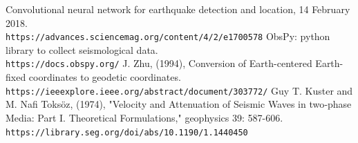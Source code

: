 \documentclass[10pt,conference,compsocconf]{IEEEtran}
\begin{document}
\begin{thebibliography}{9}
Convolutional neural network for earthquake detection and location, 14 February 2018. \\\texttt{https://advances.sciencemag.org/content/4/2/e1700578}
ObsPy: python library to collect seismological data.
\\\texttt{https://docs.obspy.org/}
J. Zhu, (1994),  Conversion of Earth-centered Earth-fixed coordinates to geodetic coordinates. \\\texttt{https://ieeexplore.ieee.org/abstract/document/303772/}
Guy T. Kuster and M. Nafi Toksöz, (1974), "Velocity and Attenuation of Seismic Waves in two‐phase Media: Part I. Theoretical Formulations," geophysics 39: 587-606. \\\texttt{https://library.seg.org/doi/abs/10.1190/1.1440450}
\end{thebibliography}
\end{document}
